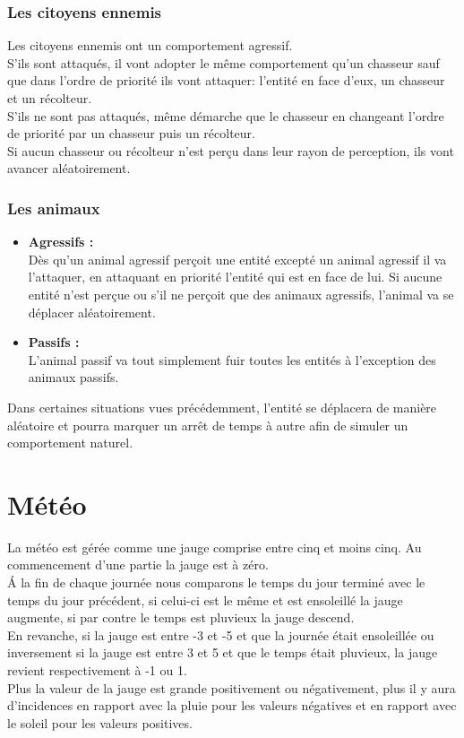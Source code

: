 \documentclass[a4paper]{memoir}
\begin{document}
				\subsubsection{Les citoyens ennemis}
					Les citoyens ennemis ont un comportement agressif.\\
					S'ils sont attaqués, il vont adopter le même comportement qu'un chasseur sauf que dans l'ordre de priorité ils vont attaquer: l'entité en face d'eux, un chasseur et un récolteur.\\
					S'ils ne sont pas attaqués, même démarche que le chasseur en changeant l'ordre de priorité par un chasseur puis un récolteur.\\
					Si aucun chasseur ou récolteur n'est perçu dans leur rayon de perception, ils vont avancer aléatoirement.
			
				\subsubsection{Les animaux}
					\begin{itemize}[label=$\bullet$]
						\item \textbf{Agressifs :} \\
							Dès qu'un animal agressif perçoit une entité excepté un animal agressif il va l'attaquer, en attaquant en priorité l'entité qui est en face de lui. Si aucune entité n'est perçue ou s'il ne perçoit que des animaux agressifs, l'animal va se déplacer aléatoirement.
						\item \textbf{Passifs :} \\
							L'animal passif va tout simplement fuir toutes les entités à l'exception des animaux passifs.
					\end{itemize} 

				Dans certaines situations vues précédemment, l’entité se déplacera de manière aléatoire et pourra marquer un arrêt de temps à autre afin de simuler un comportement naturel.
	
		\section{Météo}
			La météo est gérée comme une jauge comprise entre cinq et moins cinq. Au commencement d'une partie la jauge est à zéro.\\
			\'A la fin de chaque journée nous comparons le temps du jour terminé avec le temps du jour précédent, si celui-ci est le même et est ensoleillé la jauge augmente, si par contre le temps est pluvieux la jauge descend.\\
			En revanche, si la jauge est entre -3 et -5 et que la journée était ensoleillée ou inversement si la jauge est entre 3 et 5 et que le temps était pluvieux, la jauge revient respectivement à -1 ou 1.\\
			Plus la valeur de la jauge est grande positivement ou négativement, plus il y aura d'incidences en rapport avec la pluie pour les valeurs négatives et en rapport avec le soleil pour les valeurs positives.
	
\end{document}
